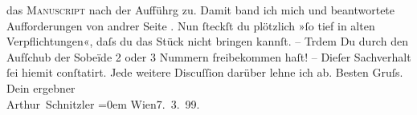 \begin{ledgroupsized}[t]{13cm}
               das \textsc{Manuscript} nach der Aufführg zu. Damit band ich mich
               und beantwortete Aufforderungen von andrer Seite \label{K_L00899_2v}\label{K_L00899_2h}. Nun ſteckſt du plötzlich »ſo tief in alten Verpflichtungen«, daſs
               du das Stück {\pb}nicht
               bringen kannſt. – Trdem Du durch den Aufſchub der Sobeïde 2
               oder 3 Nummern freibekommen haſt! – \pend
           \pstart
           Dieſer Sachverhalt ſei hiemit conſtatirt. Jede weitere Discuſſion darüber lehne ich
               ab.\pend
           \pstart
           Besten Gruſs. Dein ergebner{\\[\baselineskip]}\spacefill\mbox{Arthur Schnitzler}\pend
           \leftskip=0em{}\pstart
           Wien7. 3. 99.\pend
           \endnumbering{}\end{ledgroupsized}  \newcommand{\dateiname}{L00899}\newcommand{\titel}{Arthur Schnitzler an Hermann Bahr, 7. 3. 1899}\newcommand{\editorInnen}{ Kurt Ifkovits,  Martin Anton Müller}
            \footnotesize
\begin{ledgroupsized}[t]{11.5cm}
\end{ledgroupsized}
         
      